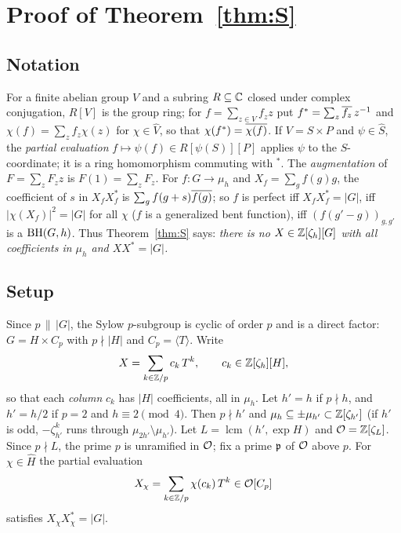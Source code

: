 \section{Proof of Theorem~\ref{thm:S}}\label{sec:S}

\subsection{Notation}\label{ssec:notation}
For a finite abelian group $V$ and a subring $R\subseteq\mathbb{C}$ closed under
complex conjugation, $R[V]$ is the group ring; for
$f=\sum_{z\in V}f_zz$ put $f^*=\sum_z\overline{f_z}\,z^{-1}$ and
$\chi(f)=\sum_zf_z\chi(z)$ for $\chi\in\widehat V$, so that
$\chi(f^*)=\overline{\chi(f)}$. If $V=S\times P$ and $\psi\in\widehat S$, the
\emph{partial evaluation} $f\mapsto\psi(f)\in R[\psi(S)][P]$ applies
$\psi$ to the $S$-coordinate; it is a ring homomorphism commuting with
${}^*$. The \emph{augmentation} of $F=\sum_zF_zz$ is $F(1)=\sum_zF_z$.
For $f:G\to\mu_h$ and $X_f=\sum_gf(g)g$, the coefficient of $s$ in
$X_fX_f^*$ is $\sum_gf(g+s)\overline{f(g)}$; so $f$ is perfect iff
$X_fX_f^*=|G|$, iff $|\chi(X_f)|^2=|G|$ for all $\chi$ ($f$ is a
generalized bent function), iff $(f(g'-g))_{g,g'}$ is a $\operatorname{BH}(G,h)$. Thus
Theorem~\ref{thm:S} says: \emph{there is no $X\in\mathbb{Z}[\zeta_h][G]$ with all
coefficients in $\mu_h$ and $XX^*=|G|$.}

\subsection{Setup}\label{ssec:S-setup}
Since $p\,\|\,|G|$, the Sylow $p$-subgroup is cyclic of order $p$ and is
a direct factor: $G=H\times C_p$ with $p\nmid|H|$ and $C_p=\langle
T\rangle$. Write
\begin{equation}\label{eq:columns}
 X=\sum_{k\in\mathbb{Z}/p}c_k\,T^k,\qquad c_k\in\mathbb{Z}[\zeta_h][H],
\end{equation}
so that each \emph{column} $c_k$ has $|H|$ coefficients, all in $\mu_h$.
Let $h'=h$ if $p\nmid h$, and $h'=h/2$ if $p=2$ and $h\equiv2\pmod4$.
Then $p\nmid h'$ and $\mu_h\subseteq\pm\mu_{h'}\subset\mathbb{Z}[\zeta_{h'}]$
(if $h'$ is odd, $-\zeta_{h'}^k$ runs through $\mu_{2h'}\setminus\mu_{h'}$).
Let $L=\operatorname{lcm}(h',\exp H)$ and $\mathcal{O}=\mathbb{Z}[\zeta_L]$. Since
$p\nmid L$, the prime $p$ is unramified in $\mathcal{O}$; fix a prime $\mathfrak{p}$ of
$\mathcal{O}$ above $p$. For $\chi\in\widehat H$ the partial evaluation
\[
 X_\chi=\sum_{k\in\mathbb{Z}/p}\chi(c_k)\,T^k\in\mathcal{O}[C_p]
\]
satisfies $X_\chi X_\chi^*=|G|$.

